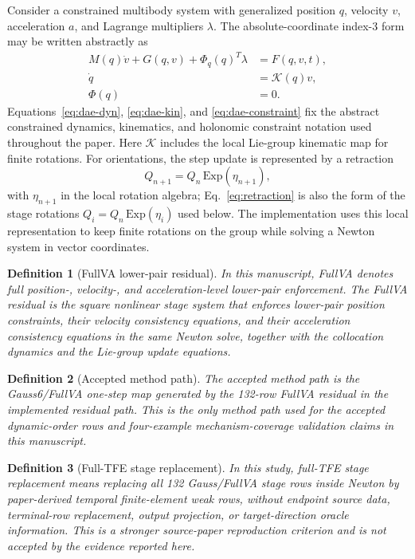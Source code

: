 \documentclass[preprint,12pt]{elsarticle}
\newtheorem{definition}{Definition}
\newcommand{\method}{Gauss6\slash FullVA}
\newcommand{\tfe}{TFE}
\begin{document}
Consider a constrained multibody system with generalized position $q$,
velocity $v$, acceleration $a$, and Lagrange multipliers $\lambda$. The
absolute-coordinate index-3 form may be written abstractly as
\begin{align}
  M(q)\dot v + G(q,v) + \Phi_q(q)^T\lambda &= F(q,v,t), \label{eq:dae-dyn}\\
  \dot q &= \mathcal{K}(q)v, \label{eq:dae-kin}\\
  \Phi(q) &= 0. \label{eq:dae-constraint}
\end{align}
Equations~\eqref{eq:dae-dyn}, \eqref{eq:dae-kin}, and
\eqref{eq:dae-constraint} fix the
abstract constrained dynamics, kinematics, and holonomic constraint notation
used throughout the paper.
Here $\mathcal{K}$ includes the local Lie-group kinematic map for finite
rotations. For orientations, the step update is represented by a retraction
\begin{equation}
  Q_{n+1}=Q_n\,\mathrm{Exp}(\eta_{n+1}),
  \label{eq:retraction}
\end{equation}
with $\eta_{n+1}$ in the local rotation algebra; Eq.~\eqref{eq:retraction} is
also the form of the stage rotations $Q_i=Q_n\,\mathrm{Exp}(\eta_i)$ used
below. The implementation uses this
local representation to keep finite rotations on the group while solving a
Newton system in vector coordinates.

\begin{definition}[FullVA lower-pair residual]
In this manuscript, FullVA denotes full position-, velocity-, and
acceleration-level lower-pair enforcement. The FullVA residual is the square
nonlinear stage system that enforces lower-pair position constraints, their
velocity consistency equations, and their acceleration consistency equations in
the same Newton solve, together with the collocation dynamics and the
Lie-group update equations.
\end{definition}

\begin{definition}[Accepted method path]
The accepted method path is the \method{} one-step map generated by the
132-row FullVA residual in the implemented residual path. This is the only method path
used for the accepted dynamic-order rows and four-example
mechanism-coverage validation claims in this manuscript.
\end{definition}

\begin{definition}[Full-\tfe{} stage replacement]
In this study, full-\tfe{} stage replacement means replacing all 132
Gauss/FullVA stage rows inside Newton by paper-derived temporal
finite-element weak rows, without endpoint source data, terminal-row
replacement, output projection, or target-direction oracle information. This
is a stronger source-paper reproduction criterion and is not accepted by the
evidence reported here.
\end{definition}
\end{document}

